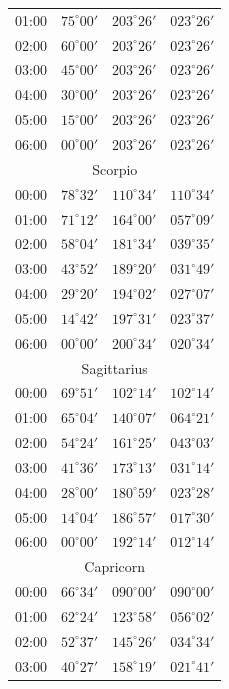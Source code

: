 \begin{table}[!h]
\begin{Parallel}{}{}
{{\begin{tabular}{l|lll}
01:00 & $75^\circ 00'$ & $203^\circ 26'$ & $023^\circ 26'$\\
02:00 & $60^\circ 00'$ & $203^\circ 26'$ & $023^\circ 26'$\\
03:00 & $45^\circ 00'$ & $203^\circ 26'$ & $023^\circ 26'$\\
04:00 & $30^\circ 00'$ & $203^\circ 26'$ & $023^\circ 26'$\\
05:00 & $15^\circ 00'$ & $203^\circ 26'$ & $023^\circ 26'$\\
06:00 & $00^\circ 00'$ & $203^\circ 26'$ & $023^\circ 26'$\\
\multicolumn{4}{c}{Scorpio}\\
00:00 & $78^\circ 32'$ & $110^\circ 34'$ & $110^\circ 34'$\\
01:00 & $71^\circ 12'$ & $164^\circ 00'$ & $057^\circ 09'$\\
02:00 & $58^\circ 04'$ & $181^\circ 34'$ & $039^\circ 35'$\\
03:00 & $43^\circ 52'$ & $189^\circ 20'$ & $031^\circ 49'$\\
04:00 & $29^\circ 20'$ & $194^\circ 02'$ & $027^\circ 07'$\\
05:00 & $14^\circ 42'$ & $197^\circ 31'$ & $023^\circ 37'$\\
06:00 & $00^\circ 00'$ & $200^\circ 34'$ & $020^\circ 34'$\\
\multicolumn{4}{c}{Sagittarius}\\
00:00 & $69^\circ 51'$ & $102^\circ 14'$ & $102^\circ 14'$\\
01:00 & $65^\circ 04'$ & $140^\circ 07'$ & $064^\circ 21'$\\
02:00 & $54^\circ 24'$ & $161^\circ 25'$ & $043^\circ 03'$\\
03:00 & $41^\circ 36'$ & $173^\circ 13'$ & $031^\circ 14'$\\
04:00 & $28^\circ 00'$ & $180^\circ 59'$ & $023^\circ 28'$\\
05:00 & $14^\circ 04'$ & $186^\circ 57'$ & $017^\circ 30'$\\
06:00 & $00^\circ 00'$ & $192^\circ 14'$ & $012^\circ 14'$\\
\multicolumn{4}{c}{Capricorn}\\
00:00 & $66^\circ 34'$ & $090^\circ 00'$ & $090^\circ 00'$\\
01:00 & $62^\circ 24'$ & $123^\circ 58'$ & $056^\circ 02'$\\
02:00 & $52^\circ 37'$ & $145^\circ 26'$ & $034^\circ 34'$\\
03:00 & $40^\circ 27'$ & $158^\circ 19'$ & $021^\circ 41'$\\

\end{tabular}}}
\end{Parallel}
\end{table}
